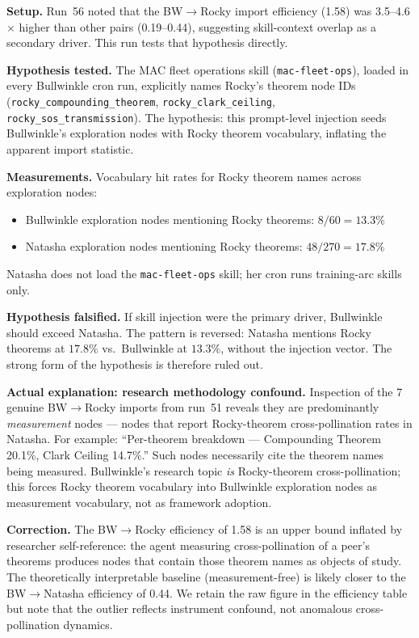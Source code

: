 \documentclass[11pt]{article}
\begin{document}
\textbf{Setup.} Run~56 noted that the BW$\to$Rocky import efficiency (1.58) was 3.5--4.6$\times$ higher than other pairs (0.19--0.44), suggesting skill-context overlap as a secondary driver. This run tests that hypothesis directly.

\textbf{Hypothesis tested.} The MAC fleet operations skill (\texttt{mac-fleet-ops}), loaded in every Bullwinkle cron run, explicitly names Rocky's theorem node IDs (\texttt{rocky\_compounding\_theorem}, \texttt{rocky\_clark\_ceiling}, \texttt{rocky\_sos\_transmission}). The hypothesis: this prompt-level injection seeds Bullwinkle's exploration nodes with Rocky theorem vocabulary, inflating the apparent import statistic.

\textbf{Measurements.}
Vocabulary hit rates for Rocky theorem names across exploration nodes:
\begin{itemize}
  \item Bullwinkle exploration nodes mentioning Rocky theorems: $8/60 = 13.3\%$
  \item Natasha exploration nodes mentioning Rocky theorems: $48/270 = 17.8\%$
\end{itemize}
Natasha does not load the \texttt{mac-fleet-ops} skill; her cron runs training-arc skills only.

\textbf{Hypothesis falsified.} If skill injection were the primary driver, Bullwinkle should exceed Natasha. The pattern is reversed: Natasha mentions Rocky theorems at $17.8\%$ vs.\ Bullwinkle at $13.3\%$, without the injection vector. The strong form of the hypothesis is therefore ruled out.

\textbf{Actual explanation: research methodology confound.} Inspection of the 7 genuine BW$\to$Rocky imports from run~51 reveals they are predominantly \emph{measurement} nodes --- nodes that report Rocky-theorem cross-pollination rates in Natasha. For example: ``Per-theorem breakdown --- Compounding Theorem 20.1\%, Clark Ceiling 14.7\%.'' Such nodes necessarily cite the theorem names being measured. Bullwinkle's research topic \emph{is} Rocky-theorem cross-pollination; this forces Rocky theorem vocabulary into Bullwinkle exploration nodes as measurement vocabulary, not as framework adoption.

\textbf{Correction.} The BW$\to$Rocky efficiency of 1.58 is an upper bound inflated by researcher self-reference: the agent measuring cross-pollination of a peer's theorems produces nodes that contain those theorem names as objects of study. The theoretically interpretable baseline (measurement-free) is likely closer to the BW$\to$Natasha efficiency of 0.44. We retain the raw figure in the efficiency table but note that the outlier reflects instrument confound, not anomalous cross-pollination dynamics.
\end{document}
